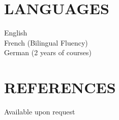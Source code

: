 \documentclass[margin]{res}
\begin{document}
\begin{resume}
\section{LANGUAGES}
                English \\
                French (Bilingual Fluency) \\
                German (2 years of courses) 

\section{REFERENCES} 
                Available upon request

\end{resume}
\end{document}
